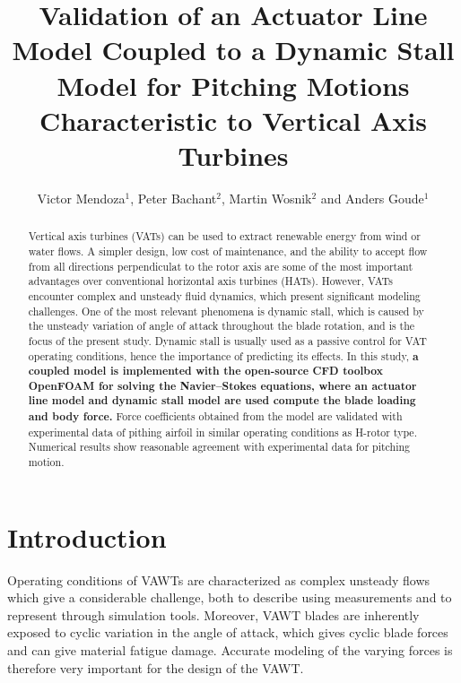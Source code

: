 \documentclass[a4paper]{jpconf}
\begin{document}
\title{Validation of an Actuator Line Model Coupled to a Dynamic Stall Model for
Pitching Motions Characteristic to Vertical Axis Turbines}


\author{Victor Mendoza$^{1}$, Peter Bachant$^{2}$, Martin Wosnik$^{2}$ and Anders Goude$^{1}$ }
\address{$^{1}$ Department of Engineering Sciences, Division of Electricity, Uppsala University, \\Uppsala 751 21, Sweden}
\address{$^{2}$ Center for Ocean Renewable Energy, University of New Hampshire, 24 Colovos Rd.,\\ Durham, NH 03824, USA}


\begin{abstract}

    Vertical axis turbines (VATs) can be used to extract renewable energy from
    wind or water flows. A simpler design, low cost of maintenance, and the
    ability to accept flow from all directions perpendiculat to the rotor axis
    are some of the most important advantages over conventional horizontal axis
    turbines (HATs). However, VATs encounter complex and unsteady fluid
    dynamics, which present significant modeling challenges. One of the most
    relevant phenomena is dynamic stall, which is caused by the unsteady
    variation of angle of attack throughout the blade rotation, and is the focus
    of the present study. Dynamic stall is usually used as a passive control for
    VAT operating conditions, hence the importance of predicting its effects. In
    this study, \textbf{a coupled model is implemented with the open-source CFD
    toolbox OpenFOAM for solving the Navier--Stokes equations, where an actuator
    line model and dynamic stall model are used compute the blade loading and
    body force.} Force coefficients obtained from the model are validated with
    experimental data of pithing airfoil in similar operating conditions as
    H-rotor type. Numerical results show reasonable agreement with experimental
    data for pitching motion.

\end{abstract}


\section{Introduction}

Operating conditions of VAWTs are characterized as complex unsteady flows which
give a considerable challenge, both to describe using measurements and to
represent through simulation tools\cite{huyer1996unsteady}. Moreover, VAWT
blades are inherently exposed to cyclic variation in the angle of attack, which
gives cyclic blade forces and can give material fatigue damage. Accurate
modeling of the varying forces is therefore very important for the design of the
VAWT.
\end{document}
